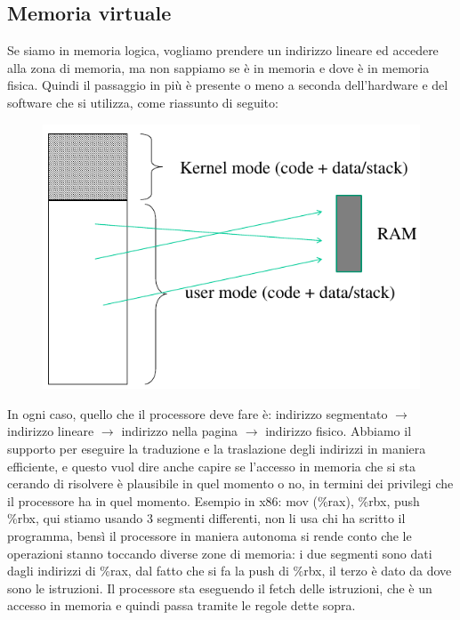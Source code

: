 \documentclass[12pt, oneside]{extbook}
\begin{document}
\subsection{Memoria virtuale}
Se siamo in memoria logica, vogliamo prendere un indirizzo lineare ed accedere alla zona di memoria, ma non sappiamo se è in memoria e dove è in memoria fisica. Quindi il passaggio in più è presente o meno a seconda dell'hardware e del software che si utilizza, come riassunto di seguito:
\begin{figure}[!h]
	\includegraphics[scale=0.3]{immagini/vm.png}
\end{figure}
In ogni caso, quello che il processore deve fare è: indirizzo segmentato $\rightarrow$ indirizzo lineare $\rightarrow$ indirizzo nella pagina $\rightarrow$ indirizzo fisico. Abbiamo il supporto per eseguire la traduzione e la traslazione degli indirizzi in maniera efficiente, e questo vuol dire anche capire se l'accesso in memoria che si sta cerando di risolvere è plausibile in quel momento o no, in termini dei privilegi che il processore ha in quel momento. Esempio in x86:
\textsf{mov (\%rax), \%rbx}, \textsf{push \%rbx}, qui stiamo usando 3 segmenti differenti, non li usa chi ha scritto il programma, bensì il processore in maniera autonoma si rende conto che le operazioni stanno toccando diverse zone di memoria: i due segmenti sono dati dagli indirizzi di \%rax, dal fatto che si fa la push di \%rbx, il terzo è dato da dove sono le istruzioni. Il processore sta eseguendo il fetch delle istruzioni, che è un accesso in memoria e quindi passa tramite le regole dette sopra.
\end{document}
